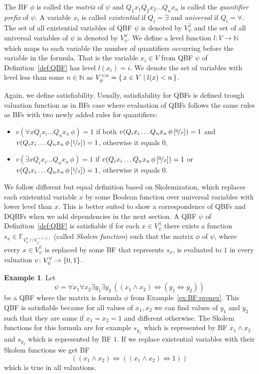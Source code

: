\documentclass[
  digital, %
  color,
  twoside, %
  table,   %
  nolof,     %
  nolot,     %
]{fithesis3}
\let\setbuilder\set
\newcommand{\simpleset}[1]{\{{#1}\}}
\renewcommand{\set}[1]{\normalexpandarg\IfSubStr{#1}{|}{\setbuilder{#1}}{\simpleset{#1}}}
\theoremstyle{definition}
\newtheorem{example}{Example}
\theoremstyle{remark}
\newcommand{\substitute}[2]{\left[ \nicefrac{#2}{#1} \right]}
\newcommand{\BFuncs}[1]{\mathbb{F}_{#1}}
\newcommand{\evars}[1]{V_{#1}^{\exists}}
\newcommand{\uvars}[1]{V_{#1}^{\forall}}
\newcommand{\lequal}{\Leftrightarrow}
\newcommand{\itholds}{\,}
\begin{document}
The BF $\phi$ is called the \emph{matrix} of $\psi$ and $Q_1 x_1 Q_2 x_2 \dots Q_n x_n$ is called the \emph{quantifier prefix} of $\psi$. A variable $x_i$ is called \emph{existential} if $Q_i = \exists$ and \emph{universal} if $Q_i = \forall$. The set of all existential variables of QBF $\psi$ is denoted by $\evars{\psi}$ and the set of all universal variables of $\psi$ is denoted by $\uvars{\psi}$. We define a level function $l\colon V \to \mathbb{N}$ which maps to each variable the number of quantifiers occurring before the variable in the formula. That is the variable $x_i \in V$ from QBF $\psi$ of Definition~\ref{def:QBF} has level $l(x_i) = i$. We denote the set of variables with level less than some $n \in \mathbb{N}$ as $V_{\psi}^{<n} = \set{x \in V | l(x) < n}$.

Again, we define satisfiability. Usually, satisfiability for QBFs is defined trough valuation function as in BFs case where evaluation of QBFs follows the same rules as BFs with two newly added rules for quantifiers:
\begin{itemize}
    \item $v(\forall x Q_i x_i \dots Q_n x_n \itholds \phi) = 1$ if both $v(Q_i x_i \dots Q_n x_n \itholds \phi\substitute{x}{0}) = 1$ and $v(Q_i x_i \dots Q_n x_n \itholds \phi\substitute{x}{1}) = 1$, otherwise it equals $0$,
    \item $v(\exists x Q_i x_i \dots Q_n x_n \itholds \phi) = 1$ if $v(Q_i x_i \dots Q_n x_n \itholds \phi\substitute{x}{0}) = 1$ or \\ $v(Q_i x_i \dots Q_n x_n \itholds \phi\substitute{x}{1}) = 1$, otherwise it equals $0$.
\end{itemize}
We follow different but equal definition based on Skolemization, which replaces each existential variable $x$ by some Boolean function over universal variables with lower level than $x$. This is better suited to show a correspondence of QBFs and DQBFs when we add dependencies in the next section. A QBF $\psi$ of Definition~\ref{def:QBF} is satisfiable if for each $x \in V_{\psi}^{\exists}$ there exists a function $s_{x} \in \BFuncs{\uvars{\psi}\cap V_{\psi}^{<l(x)}}$ (called \emph{Skolem function}) such that the matrix $\phi$ of $\psi$, where every $x \in \evars{\psi}$ is replaced by some BF that represents $s_x$, is evaluated to $1$ in every valuation $v\colon \uvars{\psi} \to \set{0,1}$.

\begin{example}
\label{ex:QBF:prenex}
Let 
\[\psi = \forall x_1 \forall x_2 \exists y_1  \exists y_2 \itholds ((x_1 \land x_2) \lequal (y_1 \lequal y_2))\]
be a QBF where the matrix is formula $\phi$ from Example~\ref{ex:BF:prenex}. This QBF is satisfiable because for all values of $x_1, x_2$ we can find values of $y_1$ and $y_2$ such that they are same if $x_1 = x_2 = 1$ and different otherwise. The Skolem functions for this formula are for example $s_{y_1}$ which is represented by BF $x_1 \land x_2$ and $s_{y_2}$ which is represented by BF $1$. If we replace existential variables with their Skolem functions we get BF
\[((x_1 \land x_2) \lequal ((x_1 \land x_2) \lequal 1))\]
which is true in all valuations.
\end{example}
\end{document}
